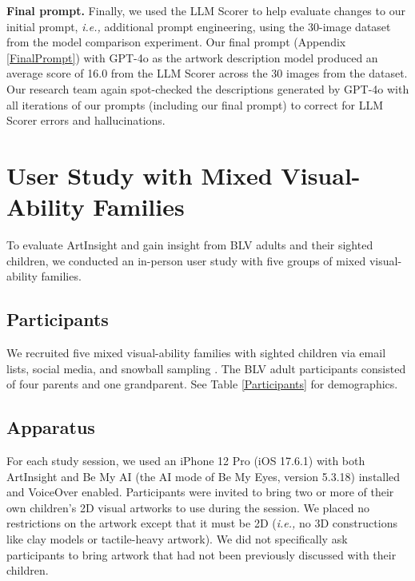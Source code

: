 \documentclass[sigconf]{acmart}
\begin{document}
\textbf{Final prompt.}
Finally, we used the LLM Scorer to help evaluate changes to our initial prompt, \textit{i.e.,} additional prompt engineering, using the 30-image dataset from the model comparison experiment. Our final prompt (Appendix \ref{FinalPrompt}) with GPT-4o as the artwork description model produced an average score of 16.0 from the LLM Scorer across the 30 images from the dataset. Our research team again spot-checked the descriptions generated by GPT-4o with all iterations of our prompts (including our final prompt) to correct for LLM Scorer errors and hallucinations.

\section{User Study with Mixed Visual-Ability Families}
To evaluate ArtInsight and gain insight from BLV adults and their sighted children, we conducted an in-person user study with five groups of mixed visual-ability families.

\subsection{Participants}
We recruited five mixed visual-ability families with sighted children via email lists, social media, and snowball sampling \cite{snowball_sampling}. The BLV adult participants consisted of four parents and one grandparent. See Table \ref{Participants} for demographics.


\subsection{Apparatus}
For each study session, we used an iPhone 12 Pro (iOS 17.6.1) with both ArtInsight and Be My AI \cite{be_my_ai_2024} (the AI mode of Be My Eyes, version 5.3.18) installed and VoiceOver enabled. Participants were invited to bring two or more of their own children's 2D visual artworks to use during the session. We placed no restrictions on the artwork except that it must be 2D (\textit{i.e.,} no 3D constructions like clay models or tactile-heavy artwork). We did not specifically ask participants to bring artwork that had not been previously discussed with their children.
\end{document}
